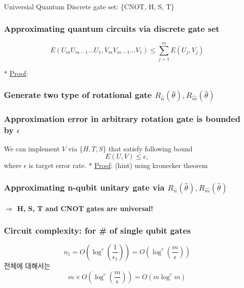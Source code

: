 \documentclass[9pt]{beamer}
\begin{document}
\begin{section}{Universial Quantum Discrete gate set: \{CNOT, H, S, T\}}
        \begin{frame}
            \frametitle{Approximating quantum circuits via discrete gate set}
                \begin{theorem}\label{thr:circuit-error}
                    $$ E\left(U_m U_{m-1} \ldots U_1, V_m V_{m-1} \ldots V_1\right) \leq \sum_{j=1}^m E\left(U_j, V_j\right)$$
                \end{theorem}
                \vspace{0.2cm}
                $\ast$ \underline{Proof}:

        
        \end{frame}

        \begin{frame}
            \frametitle{Generate two type of rotational gate $R_{{\hat n}}(\hat \theta), R_{\hat m}(\hat \theta)$}
        
            
        
        \end{frame}

        \begin{frame}
            \frametitle{Approximation error in arbitrary rotation gate is bounded by $\epsilon$}
            \begin{theorem}
                We can implement $V$ via $\{H, T, S\}$ that satisfy following bound
                $$ E(U, V) \leq \epsilon, $$
                where $\epsilon$ is target error rate.
                \vspace{0.2cm}
                $\ast$ \underline{Proof}: (hint) using kronecker theorem
            \end{theorem}
            
        
        \end{frame}

        \begin{frame}
            \frametitle{Approximating n-qubit unitary gate via ${R_{\hat n}}(\hat \theta), R_{\hat m}(\hat \theta)$}
            \framesubtitle{$\Rightarrow$ H, S, T and CNOT gates are universal!}
            
        
        \end{frame}

        \begin{frame}
            \frametitle{Circuit complexity: for \# of single qubit gates}
            \begin{theorem}
                $$n_1 = O\left(\log^c \left( \frac{1}{\epsilon_1} \right)\right) = O\left(\log^c \left( \frac{m}{\epsilon} \right)\right) $$
                전체에 대해서는 
                $$ m \times O\left(\log^c \left( \frac{m}{\epsilon} \right)\right) = O(m \log^c m)$$
            \end{theorem}
        \end{frame}



\end{section}
\end{document}
